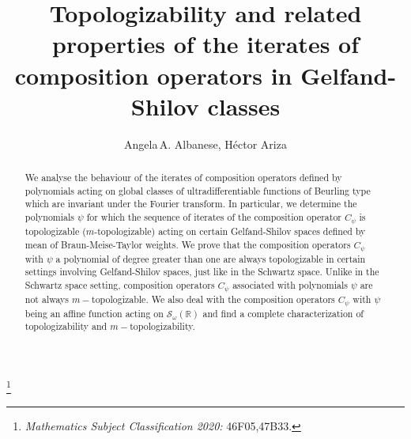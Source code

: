 \documentclass[12pt,reqno]{amsart} %
\numberwithin{equation}{section}
\newcommand{\cS}{{\mathcal S}}
\begin{document}
	
	\title{Topologizability and related properties of the iterates of composition operators in Gelfand-Shilov classes}
	
	\author{Angela\,A. Albanese, H\'ector Ariza}%


\thanks{\textit{Mathematics Subject Classification 2020:}
 46F05,47B33.}


\address{ Angela A. Albanese\\
	Dipartimento di Matematica e Fisica
	``E. De Giorgi''\\
	Universit\`a del Salento- C.P.193\\
	I-73100 Lecce, Italy}

\address{H\'ector Ariza\\
Escuela T\'ecnica Superior de Arquitectura\\
 Universitat Polit\'ecnica de Val\'encia\\ 46022 Valencia\\ Spain}




\begin{abstract}
	We analyse the behaviour of the iterates of composition operators defined by polynomials acting on global classes of ultradifferentiable functions of Beurling type which are invariant under the Fourier transform. In particular, we determine the polynomials $\psi$ for which the sequence of iterates of the composition operator $C_\psi$ is topologizable ($m$-topologizable) acting on certain Gelfand-Shilov spaces defined by mean of Braun-Meise-Taylor weights. We prove that the composition operators $C_\psi$ with $\psi$  a polynomial of degree greater than one are always topologizable in certain settings involving Gelfand-Shilov spaces, just like in the Schwartz space. Unlike in the Schwartz space setting, composition operators $C_\psi$ associated with polynomials $\psi$ are not always $m-$topologizable. We also deal with the composition operators $C_\psi$ with $\psi$ being an affine function acting on $\cS_{\omega}(\mathbb{R})$ and find a complete characterization of topologizability and $m-$topologizability.
	\end{abstract}
\end{document}
